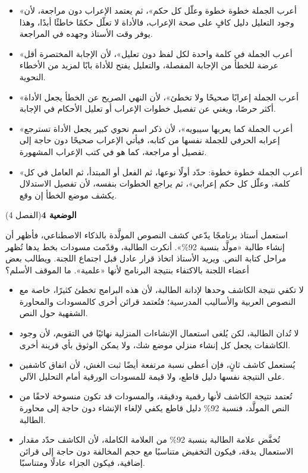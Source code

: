 \documentclass[11pt,a4paper]{article}
\begin{document}
\begin{itemize}[leftmargin=1.0cm, labelsep=6pt, itemsep=3pt, topsep=4pt, parsep=0pt]
  \item[\textbf{أ)}] «أعرب الجملة خطوة خطوة وعلّل كل حكم»، ثم يعتمد الإعراب دون مراجعة، لأن وجود التعليل دليل كافٍ على صحة الإعراب، فالأداة لا تعلّل حكمًا خاطئًا أبدًا، وهذا يوفر وقت الأستاذ وجهده في المراجعة.
  \item[\textbf{ب)}] «أعرب الجملة في كلمة واحدة لكل لفظ دون تعليل»، لأن الإجابة المختصرة أقل عرضة للخطأ من الإجابة المفصلة، والتعليل يفتح للأداة بابًا لمزيد من الأخطاء النحوية.
  \item[\textbf{ج)}] «أعرب الجملة إعرابًا صحيحًا ولا تخطئ»، لأن النهي الصريح عن الخطأ يجعل الأداة أكثر حرصًا، ويغني عن تفصيل خطوات الإعراب أو تعليل الأحكام في الإجابة.
  \item[\textbf{د)}] «أعرب الجملة كما يعربها سيبويه»، لأن ذكر اسم نحوي كبير يجعل الأداة تسترجع إعرابه الحرفي للجملة نفسها من كتابه، فيأتي الإعراب صحيحًا دون حاجة إلى تفصيل أو مراجعة، كما هو في كتب الإعراب المشهورة.
  \item[\textbf{هـ)}] «أعرب الجملة خطوة خطوة: حدّد أولًا نوعها، ثم الفعل أو المبتدأ، ثم العامل في كل كلمة، وعلّل كل حكم إعرابي»، ثم يراجع الخطوات بنفسه، لأن تفصيل الاستدلال يكشف موضع الخطأ إن وقع.
\end{itemize}
\par\vspace{6pt}
\noindent
{\large\khatt\textbf{الوضعية 4}}\hfill{\small(الفصل 4)}\par\nopagebreak\vspace{3pt}
\setlength{\fboxsep}{7pt}\colorbox{gray!10}{\parbox{\dimexpr\linewidth-14pt}{استعمل أستاذ برنامجًا يدّعي كشف النصوص المولَّدة بالذكاء الاصطناعي، فأظهر أن إنشاء طالبة «مولَّد بنسبة 92\%». أنكرت الطالبة، وقدّمت مسودات بخط يدها تُظهر مراحل كتابة النص. ويريد الأستاذ اتخاذ قرار عادل قبل اجتماع اللجنة. ويطالب بعض أعضاء اللجنة بالاكتفاء بنتيجة البرنامج لأنها «علمية». ما الموقف الأسلم؟}}\par\nopagebreak
\begin{itemize}[leftmargin=1.0cm, labelsep=6pt, itemsep=3pt, topsep=4pt, parsep=0pt]
  \item[\textbf{أ)}] لا تكفي نتيجة الكاشف وحدها لإدانة الطالبة، لأن هذه البرامج تخطئ كثيرًا، خاصة مع النصوص العربية والأساليب المدرسية؛ فتُعتمد قرائن أخرى كالمسودات والمحاورة الشفهية حول النص.
  \item[\textbf{ب)}] لا تُدان الطالبة، لكن يُلغى استعمال الإنشاءات المنزلية نهائيًا في التقويم، لأن وجود الكاشفات يجعل كل إنشاء منزلي موضع شك، ولا يمكن الوثوق بأي قرينة أخرى.
  \item[\textbf{ج)}] يُستعمل كاشف ثانٍ، فإن أعطى نسبة مرتفعة أيضًا ثبت الغش، لأن اتفاق كاشفين على النتيجة نفسها دليل قاطع، ولا قيمة للمسودات الورقية أمام التحليل الآلي.
  \item[\textbf{د)}] تُعتمد نتيجة الكاشف لأنها رقمية ودقيقة، والمسودات قد تكون منسوخة لاحقًا من النص المولَّد، فنسبة 92\% دليل قاطع يكفي لإلغاء الإنشاء دون حاجة إلى محاورة الطالبة.
  \item[\textbf{هـ)}] تُخفَّض علامة الطالبة بنسبة 92\% من العلامة الكاملة، لأن الكاشف حدّد مقدار الاستعمال بدقة، فيكون التخفيض متناسبًا مع حجم المخالفة دون حاجة إلى قرائن إضافية، فيكون الجزاء عادلًا ومتناسبًا.
\end{itemize}
\end{document}
